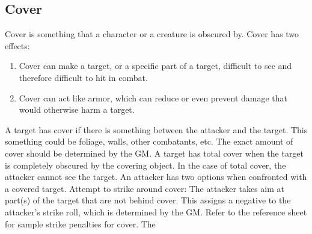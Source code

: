 \documentclass[twoside]{book}
\begin{document}
  
  

  

  
    

\subsection{Cover}
      Cover is something that a character or a creature
               is obscured by. Cover has two effects: 
\begin{enumerate}
      
  \item 
                  Cover can make a target, or a specific part of a
                 target, difficult to see and therefore difficult to hit
                 in combat. 
              
  \item 
                 Cover can act like armor, which can reduce or even
                 prevent damage that would otherwise harm a target.
                 
              
\end{enumerate}
    A target has cover if there is something between
               the attacker and the target. This something could be
               foliage, walls, other combatants, etc. The exact amount of
               cover should be determined by the GM. A target has total
               cover when the target is completely obscured by the
               covering object. In the case of total cover, the attacker
               cannot see the target.   An attacker has two options when confronted with a
               covered target.   Attempt to strike around cover: The attacker takes
               aim at part(s) of the target that are not behind cover.
               This assigns a negative to the attacker's strike
               roll, which is determined by the GM. Refer to the
               reference sheet for sample strike penalties for cover. The
\end{document}
